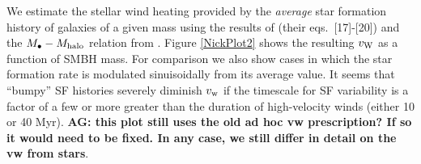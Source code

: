 We estimate the stellar wind heating provided by the {\it average} star formation history of galaxies of a given mass using the results of \citet{MosterNaab+:2013a} (their eqs.~[17]-[20]) and the $M_{\bullet}-M_{\rm
  halo}$ relation from \citet{BandaraCrampton+:2009a}.  Figure \ref{NickPlot2} shows the resulting $v_{\rm W}$ as a function of SMBH mass.  For comparison we also show cases in which the star formation rate is modulated sinuisoidally from its average value.   It seems that ``bumpy'' SF histories severely diminish $v_{\rm w}$ if the timescale for SF variability is a factor of a few or more greater than the duration of high-velocity winds (either 10 or 40 Myr). {\bf AG: this plot still uses the old ad hoc vw
  prescription? If so it would need to be fixed. In any case, we still
  differ in detail on the vw from stars}.  

